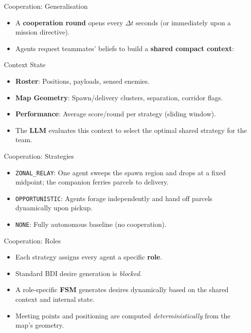\begin{frame}{Cooperation: Generalisation}
  \begin{itemize}
    \item A \textbf{cooperation round} opens every $\Delta t$ seconds (or immediately upon a mission directive).
    \item Agents request teammates' beliefs to build a \textbf{shared compact context}:
  \end{itemize}
  
  \begin{block}{Context State}
      \begin{itemize}
        \item \textbf{Roster}: Positions, payloads, sensed enemies.
        \item \textbf{Map Geometry}: Spawn/delivery clusters, separation, corridor flags.
        \item \textbf{Performance}: Average score/round per strategy (sliding window).
      \end{itemize}
  \end{block}

  \begin{itemize}
    \item[$\Rightarrow$] The \textbf{LLM} evaluates this context to select the optimal shared strategy for the team.
  \end{itemize}
\end{frame}

\begin{frame}{Cooperation: Strategies}
  \begin{itemize}
    \item \texttt{ZONAL\_RELAY}: One agent sweeps the spawn region and drops at a fixed midpoint; the companion ferries parcels to delivery.
    \item \texttt{OPPORTUNISTIC}: Agents forage independently and hand off parcels dynamically upon pickup.
    \item \texttt{NONE}: Fully autonomous baseline (no cooperation).
  \end{itemize}
\end{frame}

\begin{frame}{Cooperation: Roles}
  \begin{itemize}
    \item Each strategy assigns every agent a specific \textbf{role}.
    \item Standard BDI desire generation is \emph{blocked}.
    \item A role-specific \textbf{FSM} generates desires dynamically based on the shared context and internal state.
    \item Meeting points and positioning are computed \emph{deterministically} from the map's geometry.
  \end{itemize}
\end{frame}

